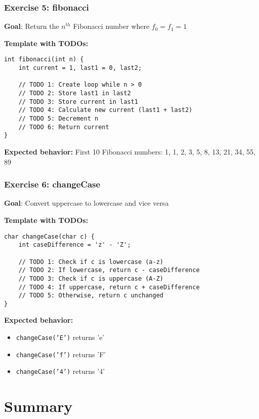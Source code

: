 \documentclass{beamer}
\begin{document}
\begin{frame}[fragile]
\frametitle{Exercise 5: fibonacci}
\textbf{Goal}: Return the $n^{th}$ Fibonacci number where $f_0 = f_1 = 1$\pause

\textbf{Template with TODOs:}
\begin{verbatim}
int fibonacci(int n) {
    int current = 1, last1 = 0, last2;
    
    // TODO 1: Create loop while n > 0
    // TODO 2: Store last1 in last2
    // TODO 3: Store current in last1
    // TODO 4: Calculate new current (last1 + last2)
    // TODO 5: Decrement n
    // TODO 6: Return current
}
\end{verbatim}
\pause

\textbf{Expected behavior:}
First 10 Fibonacci numbers: 1, 1, 2, 3, 5, 8, 13, 21, 34, 55, 89
\end{frame}

\begin{frame}[fragile]
\frametitle{Exercise 6: changeCase}
\textbf{Goal}: Convert uppercase to lowercase and vice versa\pause

\textbf{Template with TODOs:}
\begin{verbatim}
char changeCase(char c) {
    int caseDifference = 'z' - 'Z';
    
    // TODO 1: Check if c is lowercase (a-z)
    // TODO 2: If lowercase, return c - caseDifference
    // TODO 3: Check if c is uppercase (A-Z)
    // TODO 4: If uppercase, return c + caseDifference
    // TODO 5: Otherwise, return c unchanged
}
\end{verbatim}
\pause

\textbf{Expected behavior:}
\begin{itemize}
    \item \texttt{changeCase('E')} returns 'e'
    \item \texttt{changeCase('f')} returns 'F'
    \item \texttt{changeCase('4')} returns '4'
\end{itemize}
\end{frame}

\section{Summary}
\end{document}
